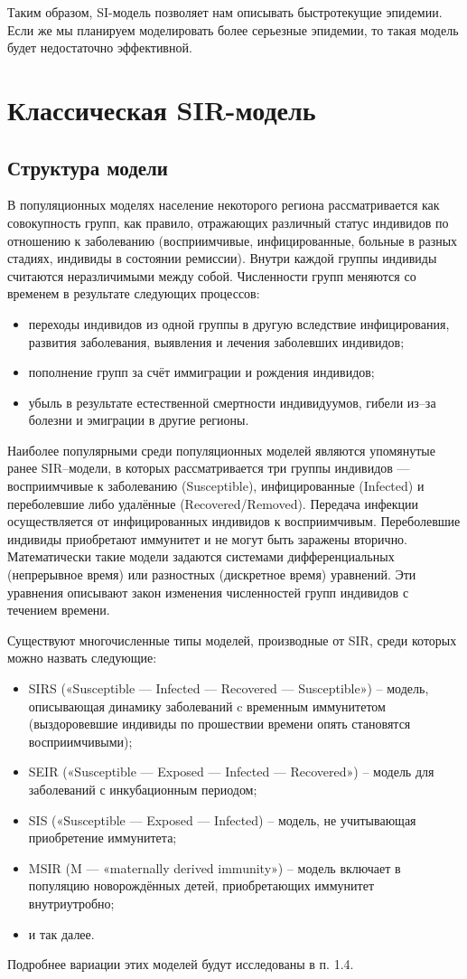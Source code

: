 \documentclass[a4paper, 14pt]{extreport}
\numberwithin{equation}{section}
\begin{document}
	Таким образом, SI-модель позволяет нам описывать быстротекущие эпидемии. Если же мы планируем моделировать более серьезные эпидемии, то такая модель будет недостаточно эффективной.
	
	
	\section{Классическая SIR-модель}
	\subsection{Структура модели}
	В популяционных моделях население некоторого региона рассматривается как совокупность групп, как правило, отражающих различный статус индивидов по отношению к заболеванию (восприимчивые, инфицированные, больные в разных стадиях, индивиды в состоянии ремиссии). Внутри каждой группы индивиды считаются неразличимыми между собой. Численности групп меняются со временем в результате следующих процессов:
	\begin{itemize}
		\item переходы индивидов из одной группы в другую вследствие
		инфицирования, развития заболевания, выявления и лечения заболевших
		индивидов;
		\item пополнение групп за счёт иммиграции и рождения индивидов;
		\item убыль в результате естественной смертности индивидуумов, гибели из–за
		болезни и эмиграции в другие регионы.
	\end{itemize}
	Наиболее популярными среди популяционных моделей являются упомянутые ранее SIR–модели, в которых рассматривается три группы индивидов --- восприимчивые к заболеванию (Susceptible), инфицированные (Infected) и переболевшие либо удалённые
	(Recovered/Removed). Передача инфекции осуществляется от инфицированных
	индивидов к восприимчивым. Переболевшие индивиды приобретают
	иммунитет и не могут быть заражены вторично. Математически такие модели
	задаются системами дифференциальных (непрерывное время) или разностных
	(дискретное время) уравнений. Эти уравнения описывают закон изменения
	численностей групп индивидов с течением времени.
	
	Существуют многочисленные типы моделей, производные от SIR, среди
	которых можно назвать следующие:
	\begin{itemize}
		\item SIRS («Susceptible — Infected — Recovered — Susceptible») – модель,
		описывающая динамику заболеваний c временным иммунитетом
		(выздоровевшие индивиды по прошествии времени опять становятся
		восприимчивыми);
		\item SEIR («Susceptible — Exposed — Infected — Recovered») – модель для
		заболеваний с инкубационным периодом;
		\item SIS («Susceptible — Exposed — Infected) – модель, не учитывающая
		приобретение иммунитета;
		\item MSIR (M — «maternally derived immunity») – модель включает в
		популяцию новорождённых детей, приобретающих иммунитет
		внутриутробно;
		\item и так далее.
	\end{itemize}
	Подробнее вариации этих моделей будут исследованы в п. 1.4.
\end{document}
